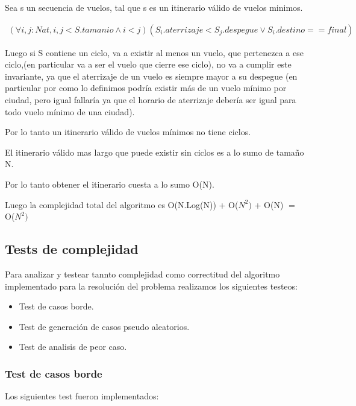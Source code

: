 Sea s un secuencia de vuelos, tal que s es un itinerario v\'alido de vuelos minimos.

\begin{align*}
(\forall i,j:Nat, i,j<S.tamanio \wedge i<j)(S_{i}.aterrizaje < S_{j}.despegue
\vee S_{i}.destino == final)
\end{align*}

Luego si S contiene un ciclo, va a existir al menos un vuelo, que pertenezca a ese ciclo,(en particular va a ser el vuelo que cierre ese ciclo), no va a cumplir este invariante, ya que el aterrizaje de un vuelo es siempre mayor a su despegue (en particular por como lo definimos podr\'ia existir m\'as de un vuelo m\'inimo por ciudad, pero igual fallar\'ia ya que el horario de aterrizaje deber\'ia ser igual para todo vuelo m\'inimo de una ciudad).

Por lo tanto un itinerario v\'alido de vuelos m\'inimos no tiene ciclos. 

El itinerario v\'alido mas largo que puede existir sin ciclos es a lo sumo de tamaño N.

Por lo tanto obtener el itinerario cuesta a lo sumo O(N).


Luego la complejidad total del algoritmo es O(N.Log(N)) + O($N^{2})$ + O(N) $=$ O($N^{2})$
\subsection{Tests de complejidad}

Para analizar y testear tannto complejidad como correctitud del algoritmo implementado para la resoluci\'on del problema  realizamos los siguientes testeos:

\begin{itemize}
  \item Test de casos borde.
  \item Test de generaci\'on de casos pseudo aleatorios.
  \item Test de analisis de peor caso.
\end{itemize}

\newpage

\subsubsection{Test de casos borde}


Los siguientes test fueron implementados:


